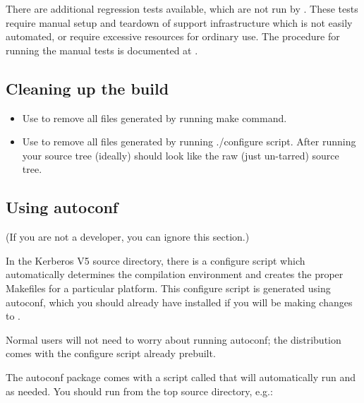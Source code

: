 \documentclass[letterpaper,10pt,english]{sphinxmanual}
\begin{document}
There are additional regression tests available, which are not run
by .  These tests require manual setup and teardown of
support infrastructure which is not easily automated, or require
excessive resources for ordinary use.  The procedure for running
the manual tests is documented at
.


\subsection{Cleaning up the build}
\label{\detokenize{build/doing_build:cleaning-up-the-build}}\begin{itemize}
\item {} 
Use  to remove all files generated by running make
command.

\item {} 
Use  to remove all files generated by running
./configure script.  After running  your source
tree (ideally) should look like the raw (just un-tarred) source
tree.

\end{itemize}


\subsection{Using autoconf}
\label{\detokenize{build/doing_build:using-autoconf}}
(If you are not a developer, you can ignore this section.)

In the Kerberos V5 source directory, there is a configure script which
automatically determines the compilation environment and creates the
proper Makefiles for a particular platform.  This configure script is
generated using autoconf, which you should already have installed if
you will be making changes to .

Normal users will not need to worry about running autoconf; the
distribution comes with the configure script already prebuilt.

The autoconf package comes with a script called  that
will automatically run  and  as needed.  You
should run  from the top source directory, e.g.:

%
\begin{sphinxVerbatim}[commandchars=\\\{\}]
 
 
\end{sphinxVerbatim}
\end{document}
